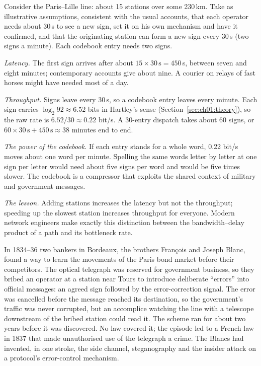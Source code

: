 \begin{worked}
Consider the Paris--Lille line: about 15 stations over some 230\,km. Take as illustrative
assumptions, consistent with the usual accounts, that each operator needs about 30\,s to see a new
sign, set it on his own mechanism and have it confirmed, and that the originating station can form
a new sign every 30\,s (two signs a minute). Each codebook entry needs two signs.

\emph{Latency.} The first sign arrives after about $15\times30\,\mathrm{s}=450$\,s, between seven and
eight minutes; contemporary accounts give about nine. A courier on relays of fast horses might have
needed most of a day.

\emph{Throughput.} Signs leave every 30\,s, so a codebook entry leaves every minute. Each sign
carries $\log_2 92\approx6.52$ bits in Hartley's sense (Section~\ref{sec:ch01:theory}), so the
raw rate is $6.52/30\approx0.22$ bit/s. A 30-entry dispatch takes about 60 signs, or
$60\times30\,\mathrm{s}+450\,\mathrm{s}\approx38$ minutes end to end.

\emph{The power of the codebook.} If each entry stands for a whole word, 0.22 bit/s moves about
one word per minute. Spelling the same words letter by letter at one sign per letter would need
about five signs per word and would be five times slower. The codebook is a compressor that
exploits the shared context of military and government messages.

\emph{The lesson.} Adding stations increases the latency but not the throughput; speeding up
the slowest station increases throughput for everyone. Modern network engineers make exactly
this distinction between the bandwidth--delay product of a path and its bottleneck rate.
\end{worked}

\begin{history}
In 1834--36 two bankers in Bordeaux, the brothers Fran\c{c}ois and Joseph Blanc, found a way to
learn the movements of the Paris bond market before their competitors. The optical telegraph was
reserved for government business, so they bribed an operator at a station near Tours to
introduce deliberate ``errors'' into official messages: an agreed sign followed by the
error-correction signal. The error was cancelled before the message reached its destination, so
the government's traffic was never corrupted, but an accomplice watching the line with a
telescope downstream of the bribed station could read it. The scheme ran for about two years
before it was discovered. No law covered it; the episode led to a French law in 1837 that made
unauthorised use of the telegraph a crime. The Blancs had invented, in one stroke, the side
channel, steganography and the insider attack on a protocol's error-control mechanism.
\end{history}

